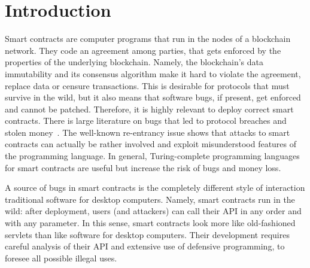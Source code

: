 \section{Introduction}\label{sec:introduction}

Smart contracts are computer programs that run
in the nodes of a blockchain network. They code
an agreement among parties, that gets enforced by the properties of the underlying
blockchain. Namely, the blockchain's data immutability and its consensus
algorithm make it hard to violate the agreement, replace data or censure transactions.
This is desirable for protocols that must survive
in the wild, but it also means that software bugs, if present,
get enforced and cannot be patched.
Therefore, it is highly relevant to deploy correct smart contracts.
There is large literature on bugs that led to
protocol breaches and stolen money~\cite{AntonopoulosW25,AtzeiBC17}.
The well-known re-entrancy issue shows that attacks to
smart contracts can actually be rather involved and exploit
misunderstood features of the programming language.
In general, Turing-complete programming languages
for smart contracts are useful but increase the risk
of bugs and money loss.

A source of bugs in smart contracts is the completely different
style of interaction \wrt traditional software for desktop computers. Namely,
smart contracts run in the wild: after deployment, users (and attackers)
can call their API in any order and with any parameter.
In this sense, smart contracts look more like old-fashioned
servlets than like software
for desktop computers. Their development requires careful analysis of their
API and extensive use of defensive programming, to foresee all
possible illegal uses.


